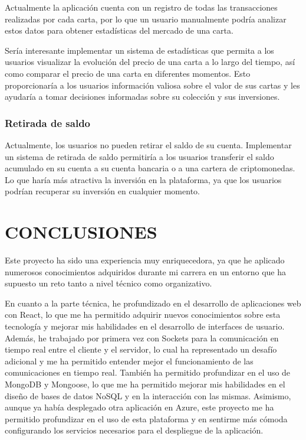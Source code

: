     Actualmente la aplicación cuenta con un registro de todas las transacciones realizadas por cada carta, por lo que un usuario manualmente podría analizar estos datos para obtener estadísticas del mercado de una carta.

    Sería interesante implementar un sistema de estadísticas que permita a los usuarios visualizar la evolución del precio de una carta a lo largo del tiempo,
    así como comparar el precio de una carta en diferentes momentos. Esto proporcionaría a los usuarios información valiosa sobre el valor de sus cartas y les ayudaría a tomar decisiones 
    informadas sobre su colección y sus inversiones.


    \subsubsection{Retirada de saldo}

    Actualmente, los usuarios no pueden retirar el saldo de su cuenta. 
    Implementar un sistema de retirada de saldo permitiría a los usuarios transferir el saldo acumulado en su cuenta a su cuenta bancaria o a una cartera de criptomonedas.
    Lo que haría más atractiva la inversión en la plataforma, ya que los usuarios podrían recuperar su inversión en cualquier momento.




\section{CONCLUSIONES}

Este proyecto ha sido una experiencia muy enriquecedora, ya que he aplicado numerosos conocimientos adquiridos durante mi carrera en un entorno que ha supuesto un 
reto tanto a nivel técnico como organizativo.

En cuanto a la parte técnica, he profundizado en el desarrollo de aplicaciones web con React, lo que me ha permitido adquirir nuevos conocimientos sobre esta 
tecnología y mejorar mis habilidades en el desarrollo de interfaces de usuario. Además, he trabajado por primera vez con Sockets para la comunicación en tiempo real entre el cliente y el servidor, 
lo cual ha representado un desafío adicional y me ha permitido entender mejor el funcionamiento de las comunicaciones en tiempo real.
También ha permitido profundizar en el uso de MongoDB y Mongoose, lo que me ha permitido mejorar mis habilidades en el diseño de bases de datos NoSQL y en la interacción con las mismas.
Asimismo, aunque ya había desplegado otra aplicación en Azure, este proyecto me ha permitido profundizar en el uso de esta plataforma 
y en sentirme más cómoda configurando los servicios necesarios para el despliegue de la aplicación.

